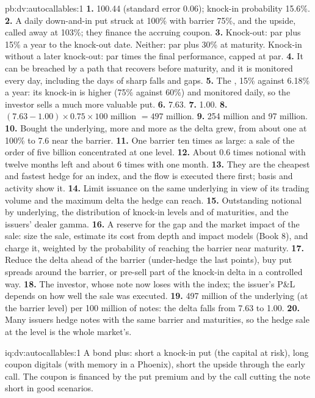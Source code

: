 \begin{solution}{pb:dv:autocallables:1}
\textbf{1.} 100.44 (standard error 0.06); knock-in probability 15.6\%.
\textbf{2.} A daily down-and-in put struck at 100\% with barrier 75\%, and the upside, called away at 103\%; they finance the accruing
coupon.
\textbf{3.} Knock-out: par plus 15\% a year to the knock-out date. Neither: par plus 30\% at maturity. Knock-in without a later knock-out:
par times the final performance, capped at par.
\textbf{4.} It can be breached by a path that recovers before maturity, and it is monitored every day, including the days of sharp falls
and gaps.
\textbf{5.} The , 15\% against 6.18\% a year: its knock-in is higher (75\% against 60\%) and monitored daily, so the investor sells
a much more valuable put.
\textbf{6.} 7.63.
\textbf{7.} 1.00.
\textbf{8.} $(7.63-1.00)\times0.75\times100$ million $=497$ million.
\textbf{9.} 254 million and 97 million.
\textbf{10.} Bought the underlying, more and more as the delta grew, from about one at 100\% to 7.6 near the barrier.
\textbf{11.} One barrier ten times as large: a sale of the order of five billion concentrated at one level.
\textbf{12.} About 0.6 times notional with twelve months left and about 6 times with one month.
\textbf{13.} They are the cheapest and fastest hedge for an index, and the flow is executed there first; basis and activity show it.
\textbf{14.} Limit issuance on the same underlying in view of its trading volume and the maximum delta the hedge can reach.
\textbf{15.} Outstanding notional by underlying, the distribution of knock-in levels and of maturities, and the issuers' dealer gamma.
\textbf{16.} A reserve for the gap and the market impact of the sale: size the sale, estimate its cost from depth and impact models
(Book 8), and charge it, weighted by the probability of reaching the barrier near maturity.
\textbf{17.} Reduce the delta ahead of the barrier (under-hedge the last points), buy put spreads around the barrier, or pre-sell part of the
knock-in delta in a controlled way.
\textbf{18.} The investor, whose note now loses with the index; the issuer's P\&L depends on how well the sale was executed.
\textbf{19.} 497 million of the underlying (at the barrier level) per 100 million of notes: the delta falls from 7.63 to 1.00.
\textbf{20.} Many issuers hedge notes with the same barrier and maturities, so the hedge sale at the level is the whole market's.
\end{solution}

\begin{solution}{iq:dv:autocallables:1}
A bond plus: short a knock-in put (the capital at risk), long coupon digitals (with memory in a Phoenix), short the upside through the
early call. The coupon is financed by the put premium and by the call cutting the note short in good scenarios.
\end{solution}

